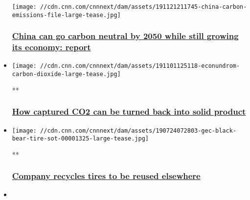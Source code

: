 \begin{itemize}
  \texttt{[image: //cdn.cnn.com/cnnnext/dam/assets/191121211745-china-carbon-emissions-file-large-tease.jpg]}

  \hypertarget{china-can-go-carbon-neutral-by-2050-while-still-growing-its-economy-report}{%
  \subsubsection{\texorpdfstring{\href{/2019/11/22/energy/china-2050-climate-crisis-report/index.html}{China
  can go carbon neutral by 2050 while still growing its economy:
  report}}{China can go carbon neutral by 2050 while still growing its economy: report}}\label{china-can-go-carbon-neutral-by-2050-while-still-growing-its-economy-report}}
\item
  \href{/videos/business/2019/11/01/econundrum-carbon-dioxide-co2-solid-product-melbourne.cnn}{}

  \texttt{[image: //cdn.cnn.com/cnnnext/dam/assets/191101125118-econundrom-carbon-dioxide-large-tease.jpg]}

  **

  \hypertarget{how-captured-co2-can-be-turned-back-into-solid-product}{%
  \subsubsection{\texorpdfstring{\href{/videos/business/2019/11/01/econundrum-carbon-dioxide-co2-solid-product-melbourne.cnn}{How
  captured CO2 can be turned back into solid
  product}}{How captured CO2 can be turned back into solid product}}\label{how-captured-co2-can-be-turned-back-into-solid-product}}
\item
  \href{/videos/business/2019/07/24/gec-black-bear-tire-sot.cnn}{}

  \texttt{[image: //cdn.cnn.com/cnnnext/dam/assets/190724072803-gec-black-bear-tire-sot-00001325-large-tease.jpg]}

  **

  \hypertarget{company-recycles-tires-to-be-reused-elsewhere}{%
  \subsubsection{\texorpdfstring{\href{/videos/business/2019/07/24/gec-black-bear-tire-sot.cnn}{Company
  recycles tires to be reused
  elsewhere}}{Company recycles tires to be reused elsewhere}}\label{company-recycles-tires-to-be-reused-elsewhere}}
\item
  \href{/2019/11/07/business/statkraft-virtual-power-plant/index.html}{}


\end{itemize}
